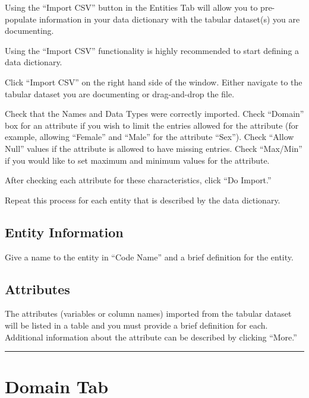 \documentclass[
]{book}
\makeatletter
\newenvironment{kframe}{%
\medskip{}
\setlength{\fboxsep}{.8em}
 \def\at@end@of@kframe{}%
 \ifinner\ifhmode%
  \def\at@end@of@kframe{\end{minipage}}%
  \begin{minipage}{\columnwidth}%
 \fi\fi%
 \def\FrameCommand##1{\hskip\@totalleftmargin \hskip-\fboxsep
 \colorbox{shadecolor}{##1}\hskip-\fboxsep
     \hskip-\linewidth \hskip-\@totalleftmargin \hskip\columnwidth}%
 \MakeFramed {\advance\hsize-\width
   \@totalleftmargin\z@ \linewidth\hsize
   \@setminipage}}%
 {\par\unskip\endMakeFramed%
 \at@end@of@kframe}
\newenvironment{rmdblock}[1]
  {
  \begin{itemize}
  \renewcommand{\labelitemi}{
    \raisebox{-.7\height}[0pt][0pt]{
      {\setkeys{Gin}{width=3em,keepaspectratio}\texttt{[image: images/\#1]}}
    }
  }
  \setlength{\fboxsep}{1em}
  \begin{kframe}
  \item
  }
  {
  \end{kframe}
  \end{itemize}
  }
\newenvironment{rmdtip}
  {\begin{rmdblock}{tip}}
  {\end{rmdblock}}
\makeatother
\begin{document}
Using the ``Import CSV'' button in the Entities Tab will allow you to pre-populate information in your data dictionary with the tabular dataset(s) you are documenting.

\begin{rmdtip}
Using the ``Import CSV'' functionality is highly recommended to start
defining a data dictionary.
\end{rmdtip}

Click ``Import CSV'' on the right hand side of the window. Either navigate to the tabular dataset you are documenting or drag-and-drop the file.

Check that the Names and Data Types were correctly imported. Check ``Domain'' box for an attribute if you wish to limit the entries allowed for the attribute (for example, allowing ``Female'' and ``Male'' for the attribute ``Sex''). Check ``Allow Null'' values if the attribute is allowed to have missing entries. Check ``Max/Min'' if you would like to set maximum and minimum values for the attribute.

After checking each attribute for these characteristics, click ``Do Import.''

Repeat this process for each entity that is described by the data dictionary.

\hypertarget{entity-information}{%
\subsection{Entity Information}\label{entity-information}}

Give a name to the entity in ``Code Name'' and a brief definition for the entity.

\hypertarget{attributes}{%
\subsection{Attributes}\label{attributes}}

The attributes (variables or column names) imported from the tabular dataset will be listed in a table and you must provide a brief definition for each. Additional information about the attribute can be described by clicking ``More.''

\begin{center}\rule{0.5\linewidth}{\linethickness}\end{center}

\hypertarget{domain-tab}{%
\section{Domain Tab}\label{domain-tab}}
\end{document}
